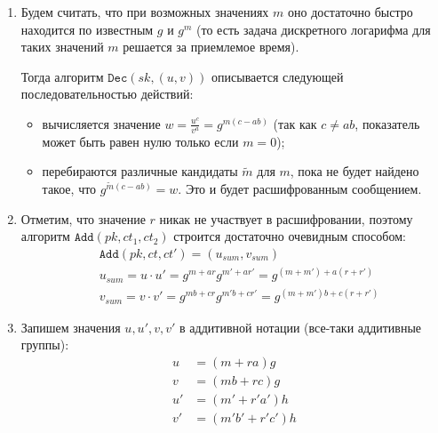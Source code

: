 \documentclass[12pt, a4paper]{extarticle}
\begin{document}
\begin{enumerate}
    \item Будем считать, что при возможных значениях $m$ оно достаточно быстро находится по известным $g$ и 
        $g ^ m$ (то есть задача дискретного логарифма для таких значений $m$ решается за приемлемое время).
        
        Тогда алгоритм $\texttt{Dec}(sk, (u, v))$ описывается следующей последовательностью действий:
        \begin{itemize}
            \item вычисляется значение $w = \frac{u ^ c}{v ^ a} = g ^ {m(c - ab)}$ (так как $c \ne ab$, 
                показатель может быть равен нулю только если $m = 0$);
            
            \item перебираются различные кандидаты $\tilde{m}$ для $m$, пока не будет найдено такое, что
                $g ^ {\tilde{m}(c - ab)} = w$. Это и будет расшифрованным сообщением.
        \end{itemize}
        
    \item Отметим, что значение $r$ никак не участвует в расшифровании, поэтому алгоритм 
        $\texttt{Add}(pk, ct_1, ct_2)$ строится достаточно очевидным способом:
        \begin{equation}
        \begin{split}
            & \texttt{Add}(pk, ct, ct') = (u_{sum}, v_{sum}) \\
            & u_{sum} = u \cdot u' = g ^ {m + a r} g ^ {m' + a r'} = 
                g ^ {(m + m') + a (r + r')} \\
            & v_{sum} = v \cdot v' = g ^ {m b + c r} g ^ {m' b + c r'} = 
                g ^ {(m + m') b + c (r + r')}
        \end{split}
        \end{equation}
        
    \item Запишем значения $u, u', v, v'$ в аддитивной нотации (все-таки аддитивные группы):
        \begin{equation}
        \begin{split}
            u  & = (m + r a) g \\
            v  & = (m b + r c) g \\
            u' & = (m' + r' a') h \\
            v' & = (m' b' + r' c') h
        \end{split}
        \end{equation}
        

\end{enumerate}
\end{document}
